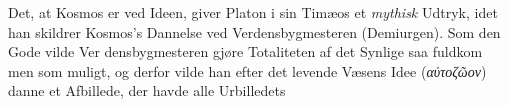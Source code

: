 \documentclass[12pt,a4paper]{book}
\newcommand{\gk}[1]{\textit{#1}}
\begin{document}
Det, at Kosmos er ved Ideen, giver Platon i sin Timæos
et \emph{mythisk} Udtryk, idet han skildrer Kosmos's Dannelse ved
Verdensbygmesteren (Demiurgen). Som den Gode vilde Ver\-%
densbygmesteren gjøre Totaliteten af det Synlige saa fuldkom\-%
men som muligt, og derfor vilde han efter det levende Væsens
Idee (\gk{αὐτοζῶον}) danne et Afbillede, der havde alle Urbilledets
\end{document}
